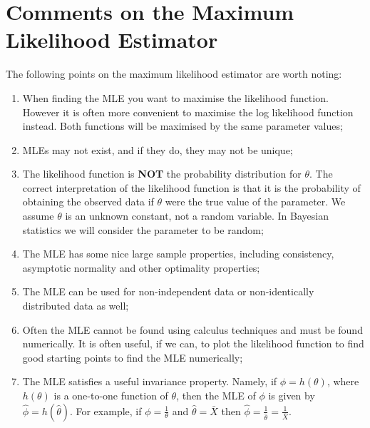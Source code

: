 \documentclass[
]{book}
\providecommand{\tightlist}{%
  \setlength{\itemsep}{0pt}\setlength{\parskip}{0pt}}
\begin{document}
\hfill\break

\hypertarget{MLE:comments}{%
\section{Comments on the Maximum Likelihood Estimator}\label{MLE:comments}}

The following points on the maximum likelihood estimator are worth noting:

\begin{enumerate}
\def\labelenumi{\arabic{enumi}.}
\tightlist
\item
  When finding the MLE you want to maximise the likelihood function. However it is often more convenient to maximise the log likelihood function instead. Both functions will be maximised by the same parameter values;\\
\item
  MLEs may not exist, and if they do, they may not be unique;\\
\item
  The likelihood function is \textbf{NOT} the probability distribution for \(\theta\). The correct interpretation of the likelihood function is that it is the probability of obtaining the observed data if \(\theta\) were the true value of the parameter. We assume \(\theta\) is an unknown constant, not a random variable. In Bayesian statistics we will consider the parameter to be random;\\
\item
  The MLE has some nice large sample properties, including consistency, asymptotic normality and other optimality properties;\\
\item
  The MLE can be used for non-independent data or non-identically distributed data as well;\\
\item
  Often the MLE cannot be found using calculus techniques and must be found numerically. It is often useful, if we can, to plot the likelihood function to find good starting points to find the MLE numerically;\\
\item
  The MLE satisfies a useful invariance property. Namely, if \(\phi = h(\theta)\), where \(h(\theta)\) is a one-to-one function of \(\theta\), then the MLE of \(\phi\) is given by \(\hat{\phi} = h (\hat{\theta})\). For example, if \(\phi = \frac{1}{\theta}\) and \(\hat{\theta}=\bar{X}\) then \(\hat{\phi} = \frac{1}{\hat{\theta}} = \frac{1}{\bar{X}}\).
\end{enumerate}
\end{document}
